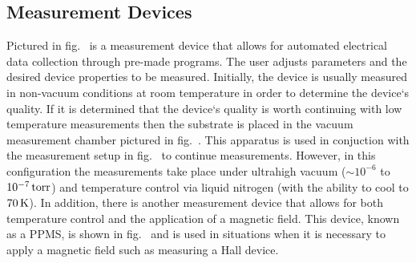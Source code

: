 \subsection{Measurement Devices}\label{subsec:measurement_devices}
Pictured in fig.~ is a measurement device that allows for automated electrical data collection through pre-made programs. The user adjusts parameters and the desired device properties to be measured. Initially, the device is usually measured in non-vacuum conditions at room temperature in order to determine the device`s quality. If it is determined that the device`s quality is worth continuing with low temperature measurements then the substrate is placed in the vacuum measurement chamber pictured in fig.~. This apparatus is used in conjuction with the measurement setup in fig.~ to continue measurements. However, in this configuration the measurements take place under ultrahigh vacuum ($\sim 10^{-6}$ to $10^{-7}\,\mathrm{torr}$) and temperature control via liquid nitrogen (with the ability to cool to $70\,\mathrm{K}$). In addition, there is another measurement device that allows for both temperature control and the application of a magnetic field. This device, known as a \ac{PPMS}, is shown in fig.~ and is used in situations when it is necessary to apply a magnetic field such as measuring a Hall device.
